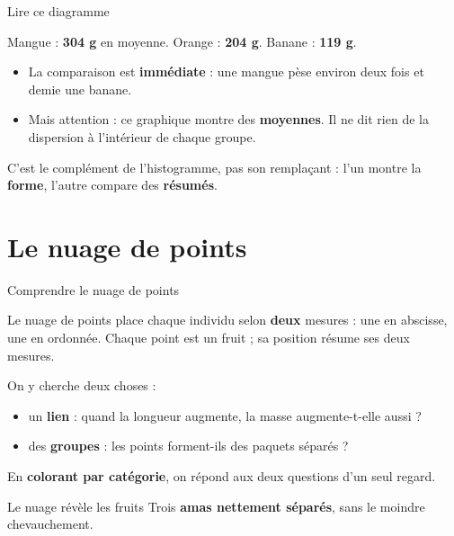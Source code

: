 \documentclass[aspectratio=169,11pt]{beamer}
\begin{document}
\begin{frame}{Lire ce diagramme}
\begin{ucadret}
{\small Mangue : \textbf{304 g} en moyenne. Orange : \textbf{204 g}. Banane : \textbf{119 g}.}
\end{ucadret}
\begin{itemize}\small
  \item La comparaison est \textbf{immédiate} : une mangue pèse environ deux fois et demie une banane.
  \item Mais attention : ce graphique montre des \textbf{moyennes}. Il ne dit rien de la dispersion à l'intérieur de chaque groupe.
\end{itemize}
{\small C'est le complément de l'histogramme, pas son remplaçant : l'un montre la \textbf{forme}, l'autre compare des \textbf{résumés}.}
\end{frame}

\section{Le nuage de points}

\begin{frame}{Comprendre le nuage de points}
\begin{ucaddef}
{\small Le nuage de points place chaque individu selon \textbf{deux} mesures : une en abscisse, une en ordonnée. Chaque point est un fruit ; sa position résume ses deux mesures.}
\end{ucaddef}
{\small On y cherche deux choses :}
\begin{itemize}\small
  \item un \textbf{lien} : quand la longueur augmente, la masse augmente-t-elle aussi ?
  \item des \textbf{groupes} : les points forment-ils des paquets séparés ?
\end{itemize}
{\small En \textbf{colorant par catégorie}, on répond aux deux questions d'un seul regard.}
\end{frame}

\begin{frame}{Le nuage révèle les fruits}
\vspace{-3pt}
{\small Trois \textbf{amas nettement séparés}, sans le moindre chevauchement.}
\end{frame}
\end{document}
